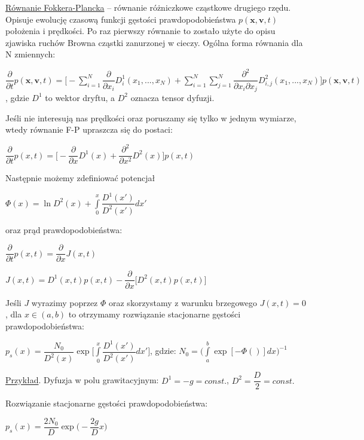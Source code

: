 \underline{Równanie Fokkera-Plancka} – równanie różniczkowe cząstkowe drugiego rzędu. Opisuje ewolucję czasową funkcji gęstości prawdopodobieństwa $ p(\textbf{x}, \textbf{v}, t) $ położenia i prędkości. Po raz pierwszy równanie to zostało użyte do opisu zjawiska ruchów Browna cząstki zanurzonej w cieczy. Ogólna forma równania dla N zmiennych: 

$ \dfrac{\partial}{\partial t} p(\textbf{x}, \textbf{v}, t) = \bigg[ -\sum\limits_{i=1}^N \dfrac{\partial}{\partial x_i} D_i^1(x_1,...,x_N) + \sum\limits_{i=1}^N \sum\limits_{j=1}^N \dfrac{\partial^2}{\partial x_i \partial x_j} D_{i, j}^2(x_1,...,x_N)\bigg] p(\textbf{x}, \textbf{v}, t) $, gdzie $ D^1 $ to wektor dryftu, a $ D^2 $ oznacza tensor dyfuzji.

Jeśli nie interesują nas prędkości oraz poruszamy się tylko w jednym wymiarze, wtedy równanie F-P upraszcza się do postaci:\newline

$ \dfrac{\partial}{\partial t} p(x, t) = \bigg[ -\dfrac{\partial}{\partial x} D^1(x) +  \dfrac{\partial^2}{\partial x^2} D^2(x)\bigg] p(x, t) $

Następnie możemy zdefiniować potencjał\newline

$ \Phi(x) = \ln D^2(x) + \int\limits_{0}^x \dfrac{D^1(x')}{D^2(x')} dx' $\newline

oraz prąd prawdopodobieństwa: \newline

$ \dfrac{\partial}{\partial t} p(x,t) = \dfrac{\partial}{\partial x} J(x, t) $

$ J(x,t) = D^1 (x,t)p(x,t) - \dfrac{\partial}{\partial x} \big[ D^2(x,t)p(x,t) \big] $

Jeśli $ J $ wyrazimy poprzez $ \Phi $ oraz skorzystamy z warunku brzegowego $ J(x,t) = 0 $, dla $ x \in (a, b) $ to otrzymamy rozwiązanie stacjonarne gęstości prawdopodobieństwa: \newline

$ p_s(x) = \dfrac{N_0}{D^2(x)} \exp \big[ \int\limits_{0}^x \dfrac{D^1(x')}{D^2(x')} dx'\big] $, gdzie: \newline
$ N_0 = \bigg( \int\limits_a^b \exp[-\Phi()] dx \bigg)^{-1} $

\underline{Przykład}. Dyfuzja w polu grawitacyjnym: $ D^1 = -g = const. $, $ D^2 = \dfrac{D}{2} = const. $

Rozwiązanie stacjonarne gęstości prawdopodobieństwa:

$ p_s(x) = \dfrac{2N_0}{D} \exp \big( -\dfrac{2g}{D}x \big) $
